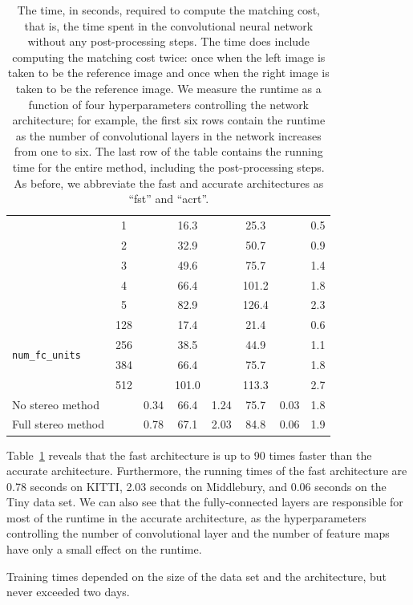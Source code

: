 \documentclass[twoside,11pt]{article}
\begin{document}
\begin{table}[p]
\begin{center}
\begin{tabular}{lc cc cc cc}
& 1 & & 16.3 & & 25.3 & & 0.5 \\
& 2 & & 32.9 & & 50.7 & & 0.9 \\
& 3 & & 49.6 & & 75.7 & & 1.4 \\
& 4 & & 66.4 & & 101.2 & & 1.8 \\
& 5 & & 82.9 & & 126.4 & & 2.3 \\\midrule
\multirow{4}{*}{\texttt{num\_fc\_units}}
& 128 & & 17.4 & & 21.4 & & 0.6 \\
& 256 & & 38.5 & & 44.9 & & 1.1 \\
& 384 & & 66.4 & & 75.7 & & 1.8 \\
& 512 & & 101.0 & & 113.3 & & 2.7 \\\midrule
No stereo method & & 0.34 & 66.4 & 1.24 & 75.7 & 0.03 & 1.8 \\
Full stereo method & & 0.78 & 67.1 & 2.03 & 84.8 & 0.06 & 1.9 \\
\bottomrule
\end{tabular}
\caption{The time, in seconds, required to compute the matching cost, that is,
the time spent in the convolutional neural network without any post-processing
steps.  The time does include computing the matching cost twice: once when the
left image is taken to be the reference image and once when the right image is
taken to be the reference image.  We measure the runtime as a function of four
hyperparameters controlling the network architecture; for example, the first
six rows contain the runtime as the number of convolutional layers in the
network increases from one to six.  The last row of the table contains the
running time for the entire method, including the post-processing steps. As
before, we abbreviate the fast and accurate architectures as ``fst'' and
``acrt''.}

\label{tbl:runtime}
\end{center}
\end{table}


Table~\ref{tbl:runtime} reveals that the fast
architecture is up to 90 times faster than the accurate architecture.
Furthermore, the running times of the fast architecture are 0.78 seconds on
KITTI, 2.03 seconds on Middlebury, and 0.06 seconds on the Tiny data set.  We
can also see that the fully-connected layers are responsible for most of the
runtime in the accurate architecture, as the hyperparameters controlling the
number of convolutional layer and the number of feature maps have only a
small effect on the runtime.

Training times depended on the size of the data set and the architecture, but
never exceeded two days.
\end{document}

